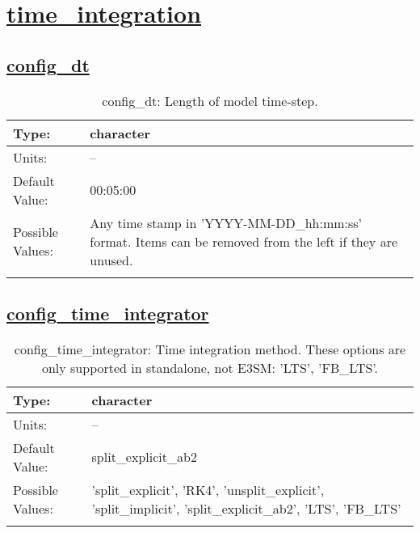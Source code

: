 \section[time\_integration]{\hyperref[sec:nm_tab_time_integration]{time\_integration}}
\label{sec:nm_sec_time_integration}
\subsection[config\_dt]{\hyperref[sec:nm_tab_time_integration]{config\_dt}}
\label{subsec:nm_sec_config_dt}
\begin{center}
\begin{longtable}{| p{2.0in} || p{4.0in} |}
    \hline
    Type: & character \\
    \hline
    Units: & -- \\
    \hline
    Default Value: & 00:05:00 \\
    \hline
    Possible Values: & Any time stamp in 'YYYY-MM-DD\_hh:mm:ss' format. Items can be removed from the left if they are unused. \\
    \hline
    \caption{config\_dt: Length of model time-step.}
\end{longtable}
\end{center}
\subsection[config\_time\_integrator]{\hyperref[sec:nm_tab_time_integration]{config\_time\_integrator}}
\label{subsec:nm_sec_config_time_integrator}
\begin{center}
\begin{longtable}{| p{2.0in} || p{4.0in} |}
    \hline
    Type: & character \\
    \hline
    Units: & -- \\
    \hline
    Default Value: & split\_explicit\_ab2 \\
    \hline
    Possible Values: & 'split\_explicit', 'RK4', 'unsplit\_explicit', 'split\_implicit', 'split\_explicit\_ab2', 'LTS', 'FB\_LTS' \\
    \hline
    \caption{config\_time\_integrator: Time integration method. These options are only supported in standalone, not E3SM: 'LTS', 'FB\_LTS'.}
\end{longtable}
\end{center}
